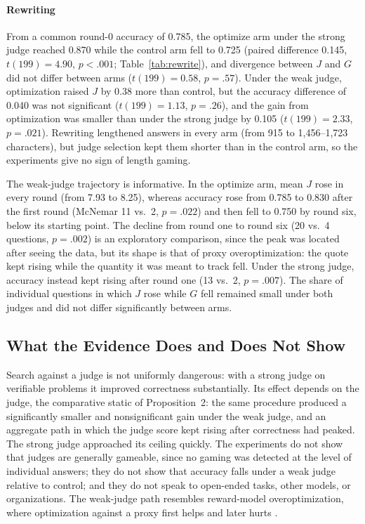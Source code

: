 \documentclass[acmsmall,screen,review]{acmart}
\theoremstyle{acmdefinition}
\begin{document}
\paragraph{Rewriting} From a common round-0 accuracy of 0.785, the optimize arm under the strong judge reached 0.870 while the control arm fell to 0.725 (paired difference 0.145, $t(199) = 4.90$, $p < .001$; Table~\ref{tab:rewrite}), and divergence between $J$ and $G$ did not differ between arms ($t(199) = 0.58$, $p = .57$). Under the weak judge, optimization raised $J$ by 0.38 more than control, but the accuracy difference of 0.040 was not significant ($t(199) = 1.13$, $p = .26$), and the gain from optimization was smaller than under the strong judge by 0.105 ($t(199) = 2.33$, $p = .021$). Rewriting lengthened answers in every arm (from 915 to 1,456--1,723 characters), but judge selection kept them shorter than in the control arm, so the experiments give no sign of length gaming.

The weak-judge trajectory is informative. In the optimize arm, mean $J$ rose in every round (from 7.93 to 8.25), whereas accuracy rose from 0.785 to 0.830 after the first round (McNemar 11 vs.\ 2, $p = .022$) and then fell to 0.750 by round six, below its starting point. The decline from round one to round six (20 vs.\ 4 questions, $p = .002$) is an exploratory comparison, since the peak was located after seeing the data, but its shape is that of proxy overoptimization: the quote kept rising while the quantity it was meant to track fell. Under the strong judge, accuracy instead kept rising after round one (13 vs.\ 2, $p = .007$). The share of individual questions in which $J$ rose while $G$ fell remained small under both judges and did not differ significantly between arms.

\subsection{What the Evidence Does and Does Not Show}

Search against a judge is not uniformly dangerous: with a strong judge on verifiable problems it improved correctness substantially. Its effect depends on the judge, the comparative static of Proposition~2: the same procedure produced a significantly smaller and nonsignificant gain under the weak judge, and an aggregate path in which the judge score kept rising after correctness had peaked. The strong judge approached its ceiling quickly. The experiments do not show that judges are generally gameable, since no gaming was detected at the level of individual answers; they do not show that accuracy falls under a weak judge relative to control; and they do not speak to open-ended tasks, other models, or organizations. The weak-judge path resembles reward-model overoptimization, where optimization against a proxy first helps and later hurts \citep{gao2023}.
\end{document}
